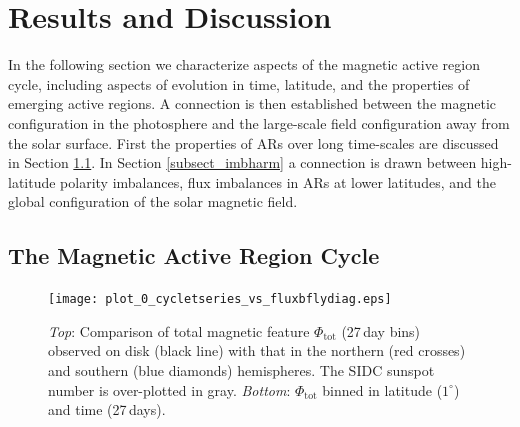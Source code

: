 \section{Results and Discussion}\label{sect:globresults}

In the following section we characterize aspects of the magnetic active region cycle, including aspects of evolution in time, latitude, and the properties of emerging active regions. A connection is then established between the magnetic configuration in the photosphere and the large-scale field configuration away from the solar surface. First the properties of \glspl{AR} over long time-scales are discussed in Section \ref{subsect_arcycle}. 
In Section \ref{subsect_imbharm} a connection is drawn between high-latitude polarity imbalances, flux imbalances in \glspl{AR} at lower latitudes, and the global configuration of the solar magnetic field.


\subsection{The Magnetic Active Region Cycle}\label{subsect_arcycle}


\begin{figure}[!t]
\centerline{\texttt{[image: plot\_0\_cycletseries\_vs\_fluxbflydiag.eps]}}
\caption[The magnetic flux and sunspot number over cycle 23.]{\emph{Top}: Comparison of total magnetic feature $\Phi_{\mathrm{tot}}$ (27\,day bins) observed on disk (black line) with that in the northern (red crosses) and southern (blue diamonds) hemispheres. The SIDC sunspot number is over-plotted in gray. \emph{Bottom}: $\Phi_{\mathrm{tot}}$ binned in latitude ($1^{\circ}$) and time (27\,days).}
\label{plot_0_cycletseries_vs_fluxbflydiag}
\end{figure}


